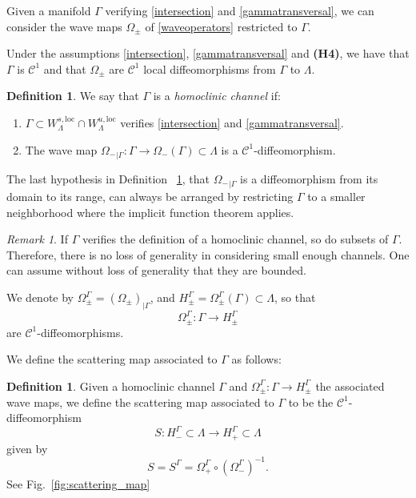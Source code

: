 \documentclass[11pt]{amsart}
\theoremstyle{definition}
\newtheorem{defn}[thm]{Definition}
\theoremstyle{remark}
\newtheorem{rem}[thm]{Remark}
\numberwithin{equation}{section}
\newcommand{\C}{\mathcal{C}}
\begin{document}
Given a manifold $\Gamma$  verifying \eqref{intersection} and  \eqref{gammatransversal}, we can consider the wave maps $\Omega _{\pm}$ of
\eqref{waveoperators} restricted to $\Gamma $.

Under the assumptions \eqref{intersection}, \eqref{gammatransversal} and {\bf (H4)},
we have that $\Gamma$ is $\C^{1}$ and that $\Omega _{\pm}$ are $\C^{1}$ local diffeomorphisms  from $\Gamma $ to $\Lambda$.


\begin{defn}\label{def:channel}
We say that $\Gamma$ is a \emph{homoclinic channel} if:
\begin{enumerate}
\item
$\Gamma \subset W_{\Lambda}^{s,\textrm{loc}}\cap W_{\Lambda}^{u,\textrm{loc}}$ verifies \eqref{intersection} and \eqref{gammatransversal}.
\item
  The wave  map  ${\Omega_-}_{\mid \Gamma}:\Gamma
\to  \Omega _{-} (\Gamma)\subset \Lambda$ is
a  $\C^{1}$-diffeomorphism.
\end{enumerate}
\end{defn}


The last hypothesis in Definition ~\ref{def:channel}, that ${\Omega_-}_{\mid \Gamma} $ is a diffeomorphism from
its domain to its range, can always be arranged by restricting $\Gamma$ to a smaller
neighborhood where the implicit function theorem applies.


\begin{rem}
If $\Gamma$ verifies the definition of a homoclinic
channel, so do subsets of $\Gamma$. Therefore, there is
no loss of generality in considering small enough channels.
One can assume  without loss of generality
that they are bounded.
\end{rem}

We denote by $\Omega_{\pm}^{\Gamma}=({\Omega_{\pm}}) _{ \mid \Gamma }$, and
$H_{\pm}^{\Gamma} = \Omega _{\pm}^{\Gamma}(\Gamma )\subset \Lambda
$, so that
\begin{equation*}\label{essential}
\Omega_{\pm}^\Gamma :\Gamma \longrightarrow H_{\pm }^{\Gamma}
\end{equation*}
are  $\C^{1}$-diffeomorphisms.





We define the scattering map associated to $\Gamma$ as follows:

\begin{defn}\label{def:scattering}
Given a homoclinic channel $\Gamma$ and $\Omega_\pm^{\Gamma}:\Gamma \to H_{\pm}^{\Gamma}$ the associated wave maps, we
define the scattering map associated to $\Gamma$ to be the $\C^1$-diffeomorphism
\[
S : H_-^\Gamma \subset \Lambda  \to H_+^\Gamma \subset \Lambda
\]
 given by
\begin{equation} \label{eq:scattering}
S= S^\Gamma=\Omega_+^\Gamma \circ (\Omega_-^\Gamma)^{-1}.
\end{equation}See Fig.~\ref{fig:scattering_map}
\end{defn}
\end{document}
